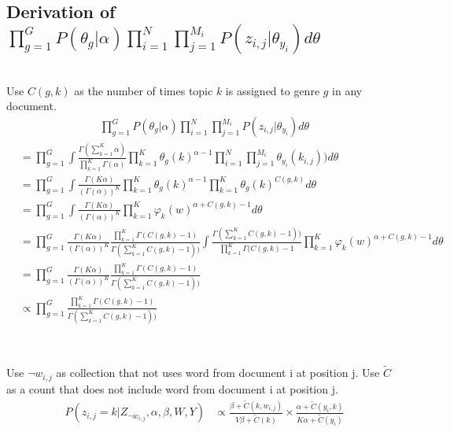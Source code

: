 \subsection{Derivation of $\prod\limits_{g=1}^G P(\theta_g|\alpha) \prod^N_{i=1}\prod^{M_i}_{j=1} P(z_{i,j}|\theta_{y_i}) d\theta$}
~\\Use $C(g,k)$ as the number of times topic $k$ is assigned to genre $g$ in any document.
\begin{align}
\prod\limits_{g=1}^G P(\theta_g|\alpha) \prod^N_{i=1}\prod^{M_i}_{j=1} P(z_{i,j}|\theta_{y_i}) d\theta
\end{align}
\begin{align}
&= \prod\limits_{g=1}^G \int\frac{\Gamma (\sum\limits_{k=1}^K \alpha)}{\prod\limits_{k=1}^K \Gamma(\alpha)} \prod\limits_{k=1}^K  \theta_{g}(k)^{\alpha-1}  \prod^N_{i=1}\prod^{M_i}_{j=1} \theta_{y_{i}}(k_{i,j})) d\theta\\
&= \prod\limits_{g=1}^G \int \frac{\Gamma (K \alpha)}{(\Gamma(\alpha))^K} \prod\limits_{k=1}^K  \theta_{g}(k)^{\alpha-1}  \prod\limits_{k=1}^K \theta_g(k)^{C(g,k)} d\theta\\
&= \prod\limits_{g=1}^G \int \frac{\Gamma (K \alpha)}{(\Gamma(\alpha))^K}  \prod\limits_{k=1}^K \varphi_{k}(w)^{\alpha + C(g,k) -1} d\theta\\
&= \prod\limits_{g=1}^G  \frac{\Gamma (K \alpha)}{(\Gamma(\alpha))^K}  \frac{\prod\limits_{k=1}^K \Gamma(C(g,k)-1)}{\Gamma(\sum\limits_{k=1}^K C(g,k)-1))} \int \frac{\Gamma(\sum\limits_{k=1}^K C(g,k)-1))}{\prod\limits_{k=1}^K \Gamma(C(g,k)-1}  \prod\limits_{k=1}^K \varphi_{k}(w)^{\alpha + C(g,k) -1} d\theta\\
&=  \prod\limits_{g=1}^G  \frac{\Gamma (K \alpha)}{(\Gamma(\alpha))^K}  \frac{\prod\limits_{k=1}^K \Gamma(C(g,k)-1)}{\Gamma(\sum\limits_{k=1}^K C(g,k)-1))} \\
&\propto  \prod\limits_{g=1}^G   \frac{\prod\limits_{k=1}^K \Gamma(C(g,k)-1)}{\Gamma(\sum\limits_{k=1}^K C(g,k)-1))} 
\end{align}

\subsection{}
~\\ Use $\neg w_{i,j}$ as collection that not uses word from document i at position j. Use $\widetilde{C}$ as a count that does not include word from document i at position j.
\begin{align}
P(z_{i,j} = k | Z_{\neg w_{i,j}}, \alpha, \beta, W, Y) &\propto \frac{\beta + \widetilde{C}(k, w_{i,j})}{V\beta + \widetilde{C}(k)} \times \frac{\alpha + \widetilde{C}(y_i, k)}{K\alpha + \widetilde{C}(y_i)}
\end{align}


